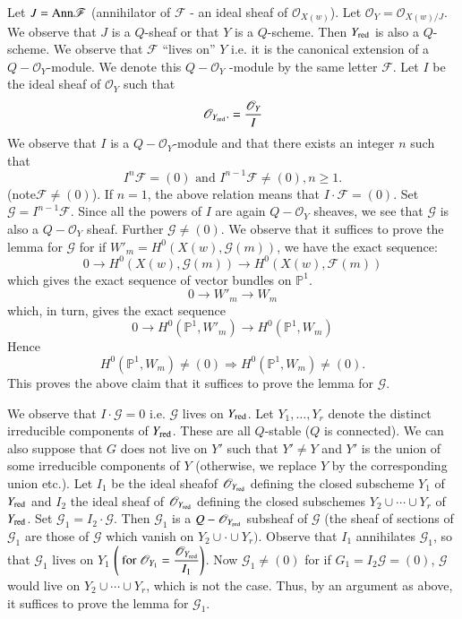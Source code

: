 \begin{Proof}
Let $J=\mathrm{Ann} \mathscr{F}$ (annihilator of $\mathscr{F}$ - an ideal sheaf of $\mathscr{O}_{X(w)}$). Let $\mathscr{O}_Y=\mathscr{O}_{X(w)/J}$. We observe that $J$ is a $Q$-sheaf or that $Y$ is a $Q$-scheme. Then $Y_{\mathrm{red}}$ is also a $Q$-scheme. We observe that $\mathscr{F}$ ``lives on'' $Y$ i.e. it is the canonical extension of a $Q-\mathscr{O}_Y$-module. We denote this $Q-\mathscr{O}_Y$ -module by the same letter $\mathscr{F}$. Let $I$ be the ideal sheaf of $\mathscr{O}_Y$ such that 
$$
\mathscr{O}_{Y_{\mathrm{red}}}.=\dfrac{\mathscr{O}_Y}{I}
$$
We observe that $I$ is a $Q-\mathscr{O}_Y$-module and that there exists an integer $n$ such that 
$$
I^{n} \mathscr{F}=(0)\text{ and } I^{n-1}\mathscr{F}\neq (0), n\geq 1. 
$$
(note\pageoriginale $\mathscr{F}\neq (0)$). If $n=1$, the above relation means that $I\cdot \mathscr{F}=(0)$. Set $\mathscr{G}=I^{n-1}\mathscr{F}$. Since all the powers of $I$ are again $Q-\mathscr{O}_Y$ sheaves, we see that $\mathscr{G}$ is also a $Q-\mathscr{O}_Y$ sheaf. Further $\mathscr{G}\neq (0)$. We observe that it suffices to prove the lemma for $\mathscr{G}$ for if $W'_m=H^{0}(X(w), \mathscr{G}(m))$, we have the exact sequence: 
$$
0\to H^{0}(X(w), \mathscr{G}(m))\to H^{0}(X(w), \mathscr{F}(m))
$$
which gives the exact sequence of vector bundles on $\mathbb{P}^{1}$. 
$$
0\to W'_m\to W_m
$$
which, in turn, gives the exact sequence 
$$
0\to H^{0}\left(\mathbb{P}^{1}, W'_m\right)\to H^{0}\left(\mathbb{P}^{1}, W_m\right)
$$
Hence 
$$
H^{0}\left(\mathbb{P}^{1}, W_m\right) \neq (0)\Rightarrow H^{0}\left(\mathbb{P}^{1}, W_m\right) \neq (0). 
$$
This proves the above claim that it suffices to prove the lemma for $\mathscr{G}$. 

We observe that $I\cdot \mathscr{G}=0$ i.e. $\mathscr{G}$ lives on $Y_{\mathrm{red}}$. Let $Y_1,\ldots, Y_r$ denote the distinct irreducible components of $Y_{\mathrm{red}}$. These are all $Q$-stable ($Q$ is connected). We can also suppose that $G$ does not live on $Y'$ such that $Y'\neq Y$ and $Y'$ is the union of some irreducible components of $Y$ (otherwise, we replace $Y$ by the corresponding union etc.). Let $I_1$ be the ideal sheaf\pageoriginale of $\mathscr{O}_{Y_{\mathrm{red}}}$ defining the closed subscheme $Y_1$ of $Y_{\mathrm{red}}$ and $I_2$ the ideal sheaf of $\mathscr{O}_{Y_{\mathrm{red}}}$ defining the closed subschemes $Y_2\cup\cdots \cup Y_r$ of $Y_{\mathrm{red}}$. Set $\mathscr{G}_1=I_2\cdot \mathscr{G}$. Then $\mathscr{G}_1$ is a $Q-\mathscr{O}_{Y_{\mathrm{red}}}$ subsheaf of $\mathscr{G}$ (the sheaf of sections of $\mathscr{G}_1$ are those of $\mathscr{G}$ which vanish on $Y_2\cup\cdot \cup Y_r)$. Observe that $I_1$ annihilates $\mathscr{G}_1$, so that $\mathscr{G}_1$ lives on $Y_1$ $\left(\text{ for } \mathscr{O}_{Y_1}=\dfrac{\mathscr{O}_{Y_{\mathrm{red}}}}{I_1}\right)$. Now $\mathscr{G}_1\neq (0)$ for if $G_1=I_2 \mathscr{G}=(0)$, $\mathscr{G}$ would live on $Y_2\cup\cdots \cup Y_r$, which is not the case. Thus, by an argument as above, it suffices to prove the lemma for $\mathscr{G}_1$. 


\end{Proof}
